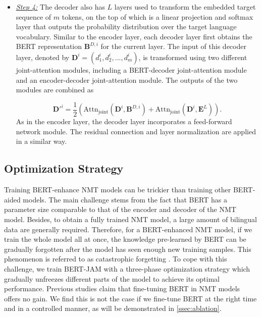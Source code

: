 \documentclass[review]{elsarticle}
\begin{document}
\begin{itemize}
\item \underline{\textit{Step 4:}}
The decoder also has $L$ layers used to transform the embedded target sequence of $m$ tokens, on the top of which is a linear projection and softmax layer that outputs the probability distribution over the target language vocabulary. Similar to the encoder layer, each decoder layer first obtains the BERT representation $\bm{B}^{D, i}$ for the current layer. The input of this decoder layer, denoted by $\bm{D}^i=(d^i_1, d^i_2, ..., d^i_m)$, is transformed using two different joint-attention modules, including a BERT-decoder joint-attention module and an encoder-decoder joint-attention module. The outputs of the two modules are combined as

\begin{equation}
    \label{eq:dec}
    \bm{D}'^i = \frac{1}{2} (\text{Attn}_{\text{joint}}(\bm{D}^i, \bm{B}^{D, i}) 
    +  \text{Attn}_{\text{joint}}(\bm{D}^i, \bm{E}^L)).
\end{equation}
As in the encoder layer, the decoder layer incorporates a feed-forward network module. The residual connection and layer normalization are applied in a similar way.

\end{itemize}

\subsection{Optimization Strategy}
\label{ssec:training}
Training BERT-enhance NMT models can be trickier than training other BERT-aided models. The main challenge stems from the fact that BERT has a parameter size comparable to that of the encoder and decoder of the NMT model. 
Besides, to obtain a fully trained NMT model, a large amount of bilingual data are generally required. 
Therefore, for a BERT-enhanced NMT model, if we train the whole model all at once, the knowledge pre-learned by BERT can be gradually forgotten after the model has seen enough new training samples. This phenomenon is referred to as catastrophic forgetting \cite{Goodfellow13, Yang20}. 
To cope with this challenge, we train BERT-JAM with a three-phase optimization strategy which gradually unfreezes different parts of the model to achieve its optimal performance. 
Previous studies \cite{Yang20} claim that fine-tuning BERT in NMT models offers no gain. We find this is not the case if we fine-tune BERT at the right time and in a controlled manner, as will be demonstrated in \cref{ssec:ablation}.
\end{document}
